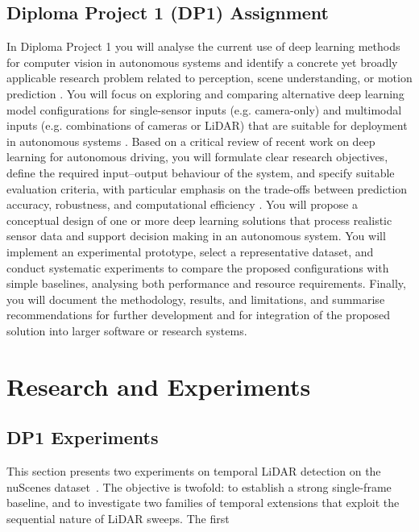 \documentclass[12pt,a4paper]{report}
\begin{document}
\section*{Diploma Project 1 (DP1) Assignment}
\quad In Diploma Project 1 you will analyse the current use of deep
learning methods for computer vision in autonomous systems and
identify a concrete yet broadly applicable research problem related
to perception, scene understanding, or motion prediction
\cite{madjid2025survey}. You will focus on exploring and comparing
alternative deep learning model configurations for single-sensor
inputs (e.g. camera-only) and multimodal inputs (e.g. combinations
of cameras or LiDAR) that are suitable for deployment in
autonomous systems \cite{Wayformer2022}. Based on a critical review
of recent work on deep learning for autonomous driving, you will
formulate clear research objectives, define the required
input–output behaviour of the system, and specify suitable evaluation
criteria, with particular emphasis on the trade-offs between
prediction accuracy, robustness, and computational efficiency
\cite{huang2022survey}. You will propose a conceptual design of one
or more deep learning solutions that process realistic sensor data
and support decision making in an autonomous system. You will
implement an experimental prototype, select a 
representative dataset, and conduct systematic experiments to compare
the proposed configurations with simple baselines, analysing both
performance and resource requirements. Finally, you will document the
methodology, results, and limitations, and summarise recommendations
for further development and for integration of the proposed solution
into larger software or research systems.



\chapter{Research and Experiments}

\section{DP1 Experiments}

\quad This section presents two experiments on temporal LiDAR
detection on the nuScenes dataset~\cite{Caesar2020nuScenes}.
The objective is twofold: to establish a strong single-frame
baseline, and to investigate two families of temporal extensions
that exploit the sequential nature of LiDAR sweeps. The first
\end{document}
